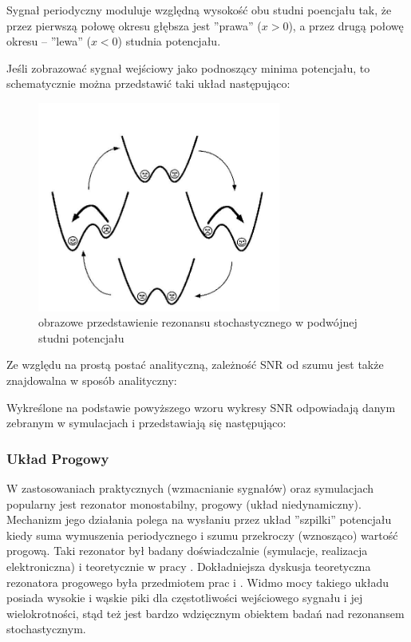   Sygnał periodyczny moduluje względną wysokość obu studni poencjału tak, że przez pierwszą połowę okresu głębsza jest ''prawa'' ($x>0$), a przez drugą połowę okresu -- ''lewa'' ($x<0$) studnia potencjału.

  Jeśli zobrazować sygnał wejściowy jako podnoszący minima potencjału, to schematycznie można przedstawić taki układ następująco:

  \begin{figure}
    \includegraphics[width=80mm]{images/sr.jpg}
    \caption{obrazowe przedstawienie rezonansu stochastycznego w podwójnej studni potencjału}
  \end{figure}


  Ze względu na prostą postać analityczną, zależność SNR od szumu jest także znajdowalna w sposób analityczny:

  Wykreślone na podstawie powyższego wzoru wykresy SNR odpowiadają danym zebranym w symulacjach i przedstawiają się następująco:



  \subsubsection{Układ Progowy}
  \label{sec:uklad_progowy}

  W zastosowaniach praktycznych (wzmacnianie sygnałów) oraz symulacjach popularny jest rezonator monostabilny, progowy (układ niedynamiczny). Mechanizm jego działania polega na wysłaniu przez układ ''szpilki'' potencjału kiedy suma wymuszenia periodycznego i szumu przekroczy (wznosząco) wartość progową. Taki rezonator był badany doświadczalnie (symulacje, realizacja elektroniczna) i teoretycznie w pracy \cite{gingl_kiss_moss}. Dokładniejsza dyskusja teoretyczna rezonatora progowego była przedmiotem prac \cite{blondeau_e53} i \cite{blondeau_e55}. Widmo mocy takiego układu posiada wysokie i wąskie piki dla częstotliwości wejściowego sygnału i jej wielokrotności, stąd też jest bardzo wdzięcznym obiektem badań nad rezonansem stochastycznym.

